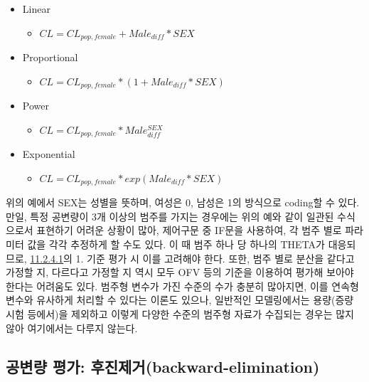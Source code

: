 \documentclass[
  11pt,
  krantz2,
  a4paper]{krantz}
\providecommand{\tightlist}{%
  \setlength{\itemsep}{0pt}\setlength{\parskip}{0pt}}
\theoremstyle{definition}
\theoremstyle{definition}
\theoremstyle{definition}
\theoremstyle{remark}
\begin{document}
\begin{itemize}
\tightlist
\item
  Linear

  \begin{itemize}
  \tightlist
  \item
    \(CL = CL_{pop,female} + Male_{diff}*SEX\)
  \end{itemize}
\item
  Proportional

  \begin{itemize}
  \tightlist
  \item
    \(CL = CL_{pop,female} * (1 + Male_{diff}*SEX)\)
  \end{itemize}
\item
  Power

  \begin{itemize}
  \tightlist
  \item
    \(CL = CL_{pop,female} * Male_{diff}^{SEX}\)
  \end{itemize}
\item
  Exponential

  \begin{itemize}
  \tightlist
  \item
    \(CL = CL_{pop,female} * exp(Male_{diff}*SEX)\)
  \end{itemize}
\end{itemize}

위의 예에서 SEX는 성별을 뜻하며, 여성은 0, 남성은 1의 방식으로 coding할 수 있다. 만일, 특정 공변량이 3개 이상의 범주를 가지는 경우에는 위의 예와 같이 일관된 수식으로서 표현하기 어려운 상황이 많아, 제어구문 중 IF문을 사용하여, 각 범주 별로 파라미터 값을 각각 추정하게 할 수도 있다. 이 때 범주 하나 당 하나의 THETA가 대응되므로, \protect\hyperlink{forward-sel-def}{11.2.4.1}의 1. 기준 평가 시 이를 고려해야 한다. 또한, 범주 별로 분산을 같다고 가정할 지, 다르다고 가정할 지 역시 모두 OFV 등의 기준을 이용하여 평가해 보아야 한다는 어려움도 있다. 범주형 변수가 가진 수준의 수가 충분히 많아지면, 이를 연속형 변수와 유사하게 처리할 수 있다는 이론도 있으나, 일반적인 모델링에서는 용량(증량 시험 등에서)을 제외하고 이렇게 다양한 수준의 범주형 자료가 수집되는 경우는 많지 않아 여기에서는 다루지 않는다.

\hypertarget{uxacf5uxbcc0uxb7c9-uxd3c9uxac00-uxd6c4uxc9c4uxc81cuxac70backward-elimination}{%
\subsection{공변량 평가: 후진제거(backward-elimination)}\label{uxacf5uxbcc0uxb7c9-uxd3c9uxac00-uxd6c4uxc9c4uxc81cuxac70backward-elimination}}
\end{document}
